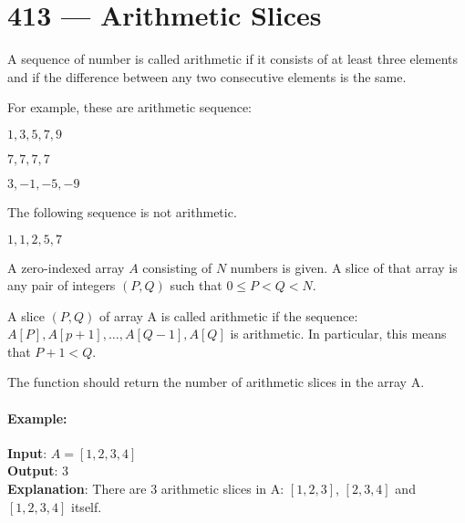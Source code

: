 \section{413 --- Arithmetic Slices}
A sequence of number is called arithmetic if it consists of at least three elements and if the difference between any two consecutive elements is the same.
\par
For example, these are arithmetic sequence:
\par
$1, 3, 5, 7, 9$
\par
$7, 7, 7, 7$
\par
$3, -1, -5, -9$
\par
The following sequence is not arithmetic.
\par
$1, 1, 2, 5, 7$
\par
A zero-indexed array $ A $ consisting of $ N $ numbers is given. A slice of that array is any pair of integers $(P, Q)$ such that $0 \leq P < Q < N$.
\par
A slice $(P, Q)$ of array A is called arithmetic if the sequence: $A[P], A[p + 1], \ldots, A[Q - 1], A[Q]$ is arithmetic. In particular, this means that $ P + 1 < Q $.
\par
The function should return the number of arithmetic slices in the array A.

\paragraph{Example:}
\begin{flushleft}
\textbf{Input}: $A = [1, 2, 3, 4]$
\\
\textbf{Output}: 3
\\
\textbf{Explanation}: There are 3 arithmetic slices in A: $[1, 2, 3]$, $[2, 3, 4]$ and $[1, 2, 3, 4]$ itself.
\end{flushleft}

